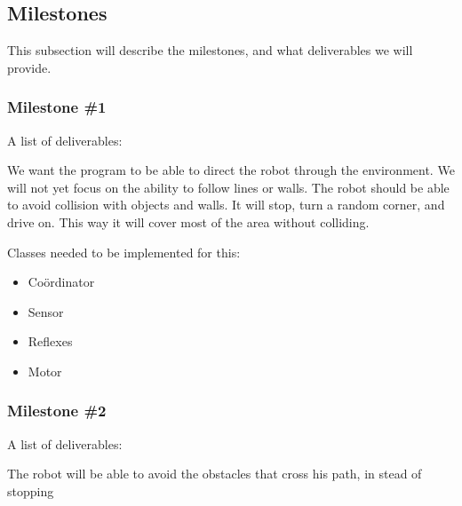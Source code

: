 \subsection{Milestones}
This subsection will describe the milestones, and what deliverables we will provide. 

\subsubsection{Milestone \#1}
A list of deliverables:
\begin{itemize}
 We want the program to be able to direct
the robot through the environment. We will not yet focus on the ability to
follow lines or walls.
 The robot should be able to avoid collision with objects
and walls. It will stop, turn a random corner, and drive on. This way it will
cover most of the area without colliding.
\end{itemize}

Classes needed to be implemented for this:
\begin{itemize}
\item Co\"ordinator
\item Sensor
\item Reflexes
\item Motor
\end{itemize}

\subsubsection{Milestone \#2}
A list of deliverables:
\begin{itemize}
 The robot will be able to avoid the obstacles that
cross his path, in stead of stopping 
\end{itemize}
